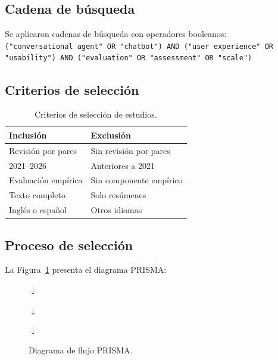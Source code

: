 \documentclass[11pt,twocolumn]{article}
\begin{document}
\subsection{Cadena de búsqueda}

Se aplicaron cadenas de búsqueda con operadores booleanos:\\
\texttt{("conversational agent" OR "chatbot") AND ("user experience" OR "usability") AND ("evaluation" OR "assessment" OR "scale")}

\subsection{Criterios de selección}

\begin{table}[H]
\centering
\caption{Criterios de selección de estudios.}
\label{tab:criterios}
\begin{tabular}{@{}p{3.2cm}p{3.2cm}@{}}
\toprule
\textbf{Inclusión} & \textbf{Exclusión} \\
\midrule
Revisión por pares & Sin revisión por pares \\
2021--2026 & Anteriores a 2021 \\
Evaluación empírica & Sin componente empírico \\
Texto completo & Solo resúmenes \\
Inglés o español & Otros idiomas \\
\bottomrule
\end{tabular}
\end{table}

\subsection{Proceso de selección}

La Figura~\ref{fig:prisma} presenta el diagrama PRISMA:

\begin{figure}[H]
\centering
{}
\vspace{2mm}

{\large$\downarrow$}

\vspace{2mm}

{\large$\downarrow$}

\vspace{2mm}

{\large$\downarrow$}

\caption{Diagrama de flujo PRISMA.}
\label{fig:prisma}
\end{figure}
\end{document}
